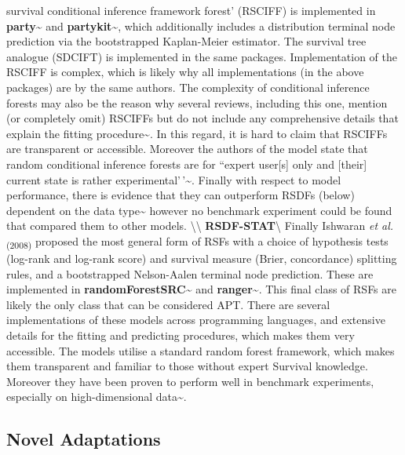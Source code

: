 \documentclass[
  letterpaper,
]{scrbook}
\theoremstyle{plain}
\theoremstyle{definition}
\theoremstyle{remark}
\begin{document}
survival conditional inference framework forest' (RSCIFF) is implemented
in \textbf{party}\textasciitilde{}\cite{pkgparty} and
\textbf{partykit}\textasciitilde{}\cite{pkgpartykit}, which additionally
includes a distribution terminal node prediction via the bootstrapped
Kaplan-Meier estimator. The survival tree analogue (SDCIFT) is
implemented in the same packages. Implementation of the RSCIFF is
complex, which is likely why all implementations (in the above packages)
are by the same authors. The complexity of conditional inference forests
may also be the reason why several reviews, including this one, mention
(or completely omit) RSCIFFs but do not include any comprehensive
details that explain the fitting
procedure\textasciitilde{}\cite{Bou-Hamad2011, Wang2017a}. In this
regard, it is hard to claim that RSCIFFs are transparent or accessible.
Moreover the authors of the model state that random conditional
inference forests are for ``expert user{[}s{]} only and {[}their{]}
current state is rather
experimental'\,'\textasciitilde{}\cite{pkgpartykit}. Finally with
respect to model performance, there is evidence that they can outperform
RSDFs (below) dependent on the data
type\textasciitilde{}\cite{Nasejje2017} however no benchmark experiment
could be found that compared them to other models.
\textbackslash\textbackslash{}
\textbf{RSDF-STAT}\label{mod:rsdfstat}\textbackslash{} Finally Ishwaran
\textit{et al.}\textsubscript{(2008)}\cite{Ishwaran2008} proposed the
most general form of RSFs with a choice of hypothesis tests (log-rank
and log-rank score) and survival measure (Brier, concordance) splitting
rules, and a bootstrapped Nelson-Aalen terminal node prediction. These
are implemented in
\textbf{randomForestSRC}\textasciitilde{}\cite{pkgrfsrc} and
\textbf{ranger}\textasciitilde{}\cite{pkgranger}. This final class of
RSFs are likely the only class that can be considered APT. There are
several implementations of these models across programming languages,
and extensive details for the fitting and predicting procedures, which
makes them very accessible. The models utilise a standard random forest
framework, which makes them transparent and familiar to those without
expert Survival knowledge. Moreover they have been proven to perform
well in benchmark experiments, especially on high-dimensional
data\textasciitilde{}\cite{Herrmann2020, Spooner2020}.

\subsection{Novel Adaptations}
\label{sec:surv_ml_models_ranfor_nov}
\end{document}
